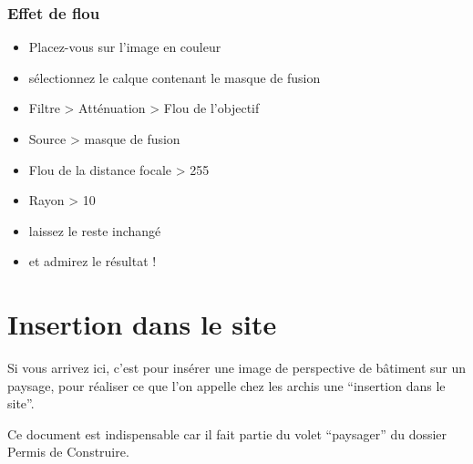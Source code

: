 \documentclass[a4paper,12pt,french]{sphinxmanual}
\begin{document}
\subsubsection{Effet de flou}
\label{psd/prepa-image_su+psd:effet-de-flou}
\noindent{}
\begin{itemize}
\item {} 
Placez-vous sur l'image en couleur

\item {} 
sélectionnez le calque contenant le masque de fusion

\item {} 
Filtre \textgreater{} Atténuation \textgreater{} Flou de l'objectif

\item {} 
Source \textgreater{} masque de fusion

\item {} 
Flou de la distance focale \textgreater{} 255

\item {} 
Rayon \textgreater{} 10

\item {} 
laissez le reste inchangé

\item {} 
et admirez le résultat !

\end{itemize}

\noindent{}


\section{Insertion dans le site}
\label{psd/insertion::doc}\label{psd/insertion:insertion-dans-le-site}
Si vous arrivez ici, c'est pour insérer une image de perspective de bâtiment sur un paysage, pour réaliser ce que l'on appelle chez les archis une ``insertion dans le site''.

Ce document est indispensable car il fait partie du volet ``paysager'' du dossier Permis de Construire.
\end{document}
